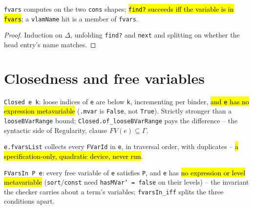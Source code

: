 \begin{lemma}
\label{family:vt-vlctx-basic}
\leanok
{} \texttt{fvars} computes on the two \texttt{cons} shapes; \hl{\texttt{find?} succeeds iff the variable is in \texttt{fvars}}; a \texttt{vlamName} hit is a member of \texttt{fvars}.
\end{lemma}
\begin{proof}
\leanok
{} Induction on $\Delta$, unfolding \texttt{find?} and \texttt{next} and splitting on whether the head entry's name matches.
\end{proof}

\section{Closedness and free variables}

\begin{definition}
\label{def:vt-closed}
\leanok
{} \texttt{Closed e k}: loose indices of \texttt{e} are below \texttt{k}, incrementing per binder, \hl{and \texttt{e} has no expression metavariable} (\texttt{.mvar} is \texttt{False}, not \texttt{True}).  Strictly stronger than a \texttt{looseBVarRange} bound; \texttt{Closed.of\_looseBVarRange} pays the difference -- the syntactic side of Regularity, clause $FV(e)\subseteq\Gamma$.
\end{definition}

\begin{definition}
\label{def:vt-fvarslist}
\leanok
{} \texttt{e.fvarsList} collects every \texttt{FVarId} in \texttt{e}, in traversal order, with duplicates -- \hl{a specification-only, quadratic device, never run}.
\end{definition}

\begin{definition}
\label{def:vt-fvarsin}
\leanok
{}
 \texttt{FVarsIn P e}: every free variable of \texttt{e} satisfies \texttt{P}, and \texttt{e} has \hl{no expression or level metavariable} (\texttt{sort}/\texttt{const} need \texttt{hasMVar' = false} on their levels) -- the invariant the checker carries about a term's variables; \texttt{fvarsIn\_iff} splits the three conditions apart.
\end{definition}

